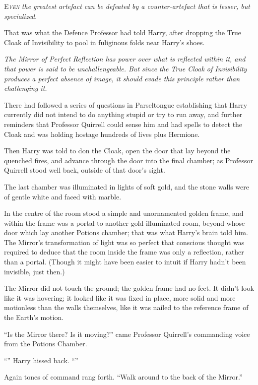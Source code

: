 
\lettrine{E}{\emph{ven}} \emph{the greatest artefact can be defeated by a counter-artefact that is lesser, but specialized}.

That was what the Defence Professor had told Harry, after dropping the True Cloak of Invisibility to pool in fuliginous folds near Harry’s shoes.

\emph{The Mirror of Perfect Reflection has power over what is reflected within it, and that power is said to be unchallengeable. But since the True Cloak of Invisibility produces a perfect absence of image, it should evade this principle rather than challenging it.}

There had followed a series of questions in Parseltongue establishing that Harry currently did not intend to do anything stupid or try to run away, and further reminders that Professor Quirrell could sense him and had spells to detect the Cloak and was holding hostage hundreds of lives plus Hermione.

Then Harry was told to don the Cloak, open the door that lay beyond the quenched fires, and advance through the door into the final chamber; as Professor Quirrell stood well back, outside of that door’s sight.

The last chamber was illuminated in lights of soft gold, and the stone walls were of gentle white and faced with marble.

In the centre of the room stood a simple and unornamented golden frame, and within the frame was a portal to another gold-illuminated room, beyond whose door which lay another Potions chamber; that was what Harry’s brain told him. The Mirror’s transformation of light was so perfect that conscious thought was required to deduce that the room inside the frame was only a reflection, rather than a portal. (Though it might have been easier to intuit if Harry hadn’t been invisible, just then.)

The Mirror did not touch the ground; the golden frame had no feet. It didn’t look like it was hovering; it looked like it was fixed in place, more solid and more motionless than the walls themselves, like it was nailed to the reference frame of the Earth’s motion.

“Is the Mirror there? Is it moving?” came Professor Quirrell’s commanding voice from the Potions Chamber.

“” Harry hissed back. “”

Again tones of command rang forth. “Walk around to the back of the Mirror.”

